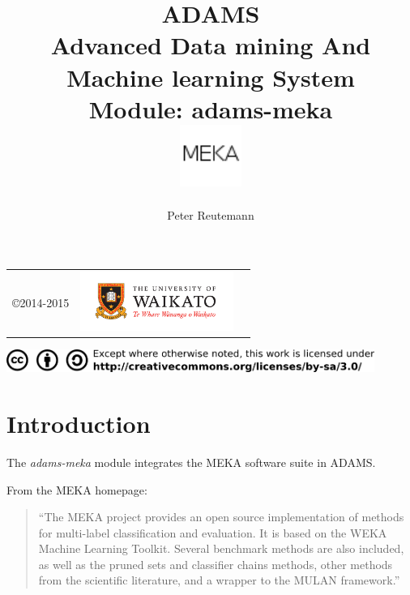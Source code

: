 \documentclass[a4paper]{book}
\title{
  \textbf{ADAMS} \\
  {\Large \textbf{A}dvanced \textbf{D}ata mining \textbf{A}nd \textbf{M}achine
  learning \textbf{S}ystem} \\
  {\Large Module: adams-meka} \\
  \vspace{1cm}
  \includegraphics[width=2cm]{images/meka-module.png} \\
}
\author{
  Peter Reutemann
}
\begin{document}
\begin{titlepage}
\maketitle

\thispagestyle{empty}
\center
\begin{table}[b]
	\begin{tabular}{c l l}
		\parbox[c][2cm]{2cm}{\copyright 2014-2015} &
		\parbox[c][2cm]{5cm}{\includegraphics[width=5cm]{images/coat_of_arms.pdf}} \\
	\end{tabular}
	\includegraphics[width=12cm]{images/cc.png} \\
\end{table}

\end{titlepage}

\tableofcontents
\listoffigures

\chapter{Introduction}
The \textit{adams-meka} module integrates the MEKA \cite{meka} software suite 
in ADAMS.

\noindent From the MEKA homepage:
\begin{quote}
``The MEKA project provides an open source implementation of methods for 
multi-label classification and evaluation. It is based on the WEKA Machine 
Learning Toolkit. Several benchmark methods are also included, as well as the 
pruned sets and classifier chains methods, other methods from the scientific 
literature, and a wrapper to the MULAN framework.''
\end{quote}

\end{document}
